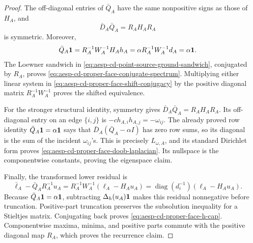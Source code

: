 \begin{proof}
The off-diagonal entries of \(\bar Q_A\) have the same nonpositive signs as
those of \(H_A\), and
\begin{equation*}
 \bar D_A\bar Q_A=R_AH_AR_A
\end{equation*}
is symmetric.  Moreover,
\begin{equation*}
 \bar Q_A\mathbf{1}
 =R_A^{-1}W_A^{-1}H_Ah_A
 =\alpha R_A^{-1}W_A^{-1}d_A
 =\alpha\mathbf{1}.
\end{equation*}
The Loewner sandwich in
\cref{eq:aesp-cd-point-source-ground-sandwich}, conjugated by \(R_A\),
proves \cref{eq:aesp-cd-proper-face-conjugate-spectrum}.  Multiplying either
linear system in \cref{eq:aesp-cd-proper-face-shift-conjugacy} by the positive
diagonal matrix \(R_A^{-1}W_A^{-1}\) proves the shifted equivalence.

For the stronger structural identity, symmetry gives
\(\bar D_A\bar Q_A=R_AH_AR_A\).  Its off-diagonal entry on an edge
\(\{i,j\}\) is \(-c h_{A,i}h_{A,j}=-\omega_{ij}\).  The already proved row
identity \(\bar Q_A\mathbf{1}=\alpha\mathbf{1}\) says that
\(\bar D_A(\bar Q_A-\alpha I)\) has zero row sums, so its diagonal is the
sum of the incident \(\omega_{ij}\)'s.  This is precisely
\(L_{\omega,A}\), and its standard Dirichlet form proves
\cref{eq:aesp-cd-proper-face-doob-laplacian}.  Its nullspace is the
componentwise constants, proving the eigenspace claim.

Finally, the transformed lower residual is
\begin{equation*}
 \bar\ell_A-\bar Q_AR_A^{-1}u_A
 =R_A^{-1}W_A^{-1}(\ell_A-H_Au_A)
 =\operatorname{diag}(d_i^{-1})(\ell_A-H_Au_A).
\end{equation*}
Because \(\bar Q_A\mathbf{1}=\alpha\mathbf{1}\), subtracting
\(\Delta_h(u_A)\mathbf{1}\) makes this residual nonnegative before truncation.
Positive-part truncation preserves the subsolution inequality for a
Stieltjes matrix.  Conjugating back proves
\cref{eq:aesp-cd-proper-face-h-cap}.  Componentwise maxima, minima, and
positive parts commute with the positive diagonal map \(R_A\), which proves
the recurrence claim.
\end{proof}

